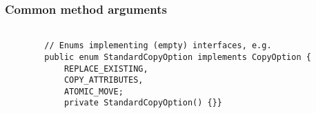 \documentclass{scrartcl}
\begin{document}
    \begin{lstlisting}



    \end{lstlisting}

    \begin{lstlisting}

    \end{lstlisting}

    \begin{lstlisting}

    \end{lstlisting}

    \begin{lstlisting}

    \end{lstlisting}

\subsubsection{Common method arguments}

    \begin{lstlisting}

        // Enums implementing (empty) interfaces, e.g.
        public enum StandardCopyOption implements CopyOption {
            REPLACE_EXISTING,
            COPY_ATTRIBUTES,
            ATOMIC_MOVE;
            private StandardCopyOption() {}}

    \end{lstlisting}
\end{document}
